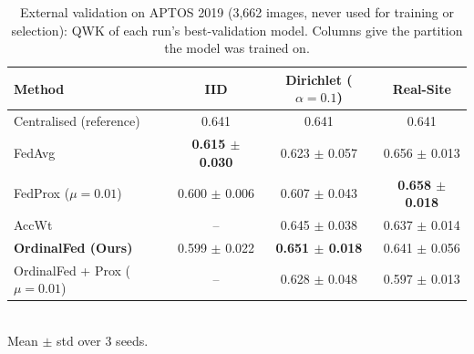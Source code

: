 \begin{table}[!t]
\centering
\caption{External validation on APTOS 2019 (3,662 images, never used for training or selection): QWK of each run's best-validation model. Columns give the partition the model was trained on.}
\label{tab:external}
\begin{tabular}{lccc}
\toprule
Method & IID & Dirichlet ($\alpha=0.1$) & Real-Site \\
\midrule
Centralised (reference) & 0.641 & 0.641 & 0.641 \\
\midrule
FedAvg & \textbf{0.615 $\pm$ 0.030} & 0.623 $\pm$ 0.057 & 0.656 $\pm$ 0.013 \\
FedProx ($\mu=0.01$) & 0.600 $\pm$ 0.006 & 0.607 $\pm$ 0.043 & \textbf{0.658 $\pm$ 0.018} \\
AccWt & -- & 0.645 $\pm$ 0.038 & 0.637 $\pm$ 0.014 \\
\textbf{OrdinalFed (Ours)} & 0.599 $\pm$ 0.022 & \textbf{0.651 $\pm$ 0.018} & 0.641 $\pm$ 0.056 \\
OrdinalFed + Prox ($\mu=0.01$) & -- & 0.628 $\pm$ 0.048 & 0.597 $\pm$ 0.013 \\
\bottomrule
\end{tabular}
\\[2pt]{\footnotesize Mean $\pm$ std over 3 seeds.}
\end{table}
